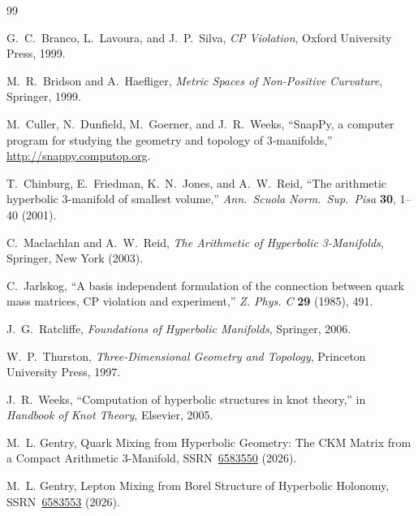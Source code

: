 \documentclass[12pt]{article}
\theoremstyle{remark}
\theoremstyle{plain}
\begin{document}
\begin{thebibliography}{99}

G.~C.~Branco, L.~Lavoura, and J.~P.~Silva,
\emph{CP Violation},
Oxford University Press, 1999.

M.~R.~Bridson and A.~Haefliger,
\emph{Metric Spaces of Non-Positive Curvature},
Springer, 1999.

M.~Culler, N.~Dunfield, M.~Goerner, and J.~R.~Weeks,
``SnapPy, a computer program for studying the geometry and topology
of 3‑manifolds,'' \url{http://snappy.computop.org}.

T.~Chinburg, E.~Friedman, K.~N.~Jones, and A.~W.~Reid,
``The arithmetic hyperbolic 3-manifold of smallest volume,''
\emph{Ann.\ Scuola Norm.\ Sup.\ Pisa} \textbf{30}, 1--40 (2001).

C.~Maclachlan and A.~W.~Reid,
\emph{The Arithmetic of Hyperbolic 3-Manifolds},
Springer, New York (2003).

C.~Jarlskog,
``A basis independent formulation of the connection between quark mass
matrices, CP violation and experiment,''
\emph{Z. Phys. C} \textbf{29} (1985), 491.

J.~G.~Ratcliffe,
\emph{Foundations of Hyperbolic Manifolds},
Springer, 2006.

W.~P.~Thurston,
\emph{Three-Dimensional Geometry and Topology},
Princeton University Press, 1997.

J.~R.~Weeks,
``Computation of hyperbolic structures in knot theory,''
in \emph{Handbook of Knot Theory}, Elsevier, 2005.


M.~L. Gentry,
\newblock Quark Mixing from Hyperbolic Geometry: The CKM Matrix from a Compact Arithmetic 3-Manifold,
\newblock SSRN~\href{https://doi.org/10.2139/ssrn.6583550}{6583550} (2026).

M.~L. Gentry,
\newblock Lepton Mixing from Borel Structure of Hyperbolic Holonomy,
\newblock SSRN~\href{https://doi.org/10.2139/ssrn.6583553}{6583553} (2026).
\end{thebibliography}
\end{document}
